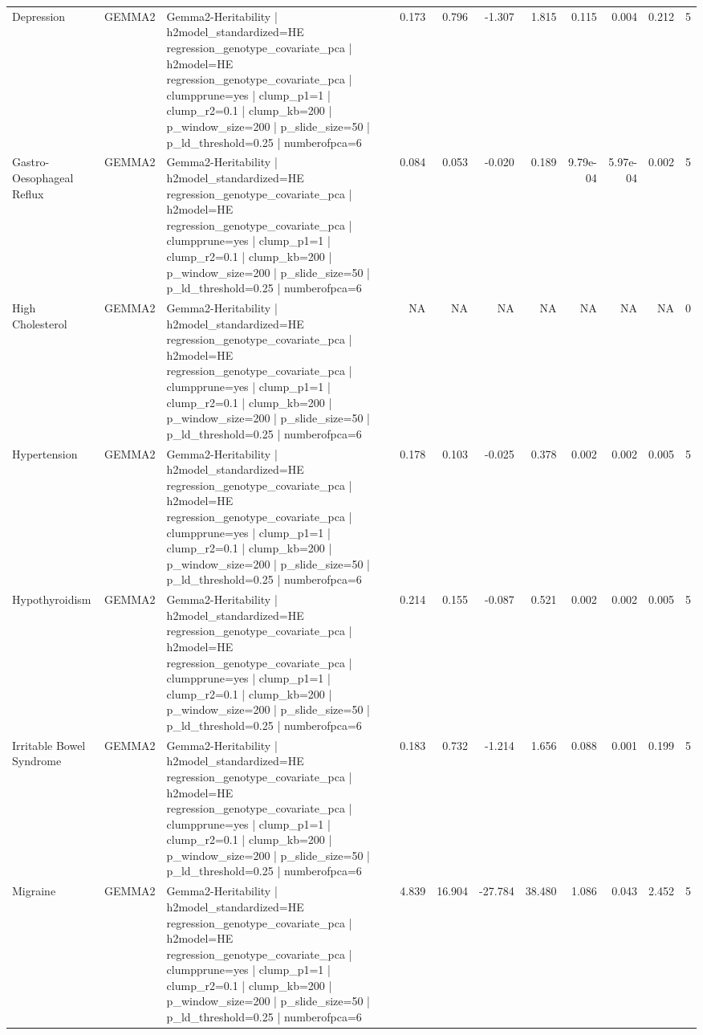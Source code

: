 \begin{landscape}
\begin{longtable}{p{2.4cm}p{1.8cm}p{6.0cm}rrrrrrrr}
Depression & GEMMA2 & Gemma2-Heritability | h2model\_standardized=HE regression\_genotype\_covariate\_pca | h2model=HE regression\_genotype\_covariate\_pca | clumpprune=yes | clump\_p1=1 | clump\_r2=0.1 | clump\_kb=200 | p\_window\_size=200 | p\_slide\_size=50 | p\_ld\_threshold=0.25 | numberofpca=6 & 0.173 & 0.796 & -1.307 & 1.815 & 0.115 & 0.004 & 0.212 & 5 \\
Gastro-Oesophageal Reflux & GEMMA2 & Gemma2-Heritability | h2model\_standardized=HE regression\_genotype\_covariate\_pca | h2model=HE regression\_genotype\_covariate\_pca | clumpprune=yes | clump\_p1=1 | clump\_r2=0.1 | clump\_kb=200 | p\_window\_size=200 | p\_slide\_size=50 | p\_ld\_threshold=0.25 | numberofpca=6 & 0.084 & 0.053 & -0.020 & 0.189 & 9.79e-04 & 5.97e-04 & 0.002 & 5 \\
High Cholesterol & GEMMA2 & Gemma2-Heritability | h2model\_standardized=HE regression\_genotype\_covariate\_pca | h2model=HE regression\_genotype\_covariate\_pca | clumpprune=yes | clump\_p1=1 | clump\_r2=0.1 | clump\_kb=200 | p\_window\_size=200 | p\_slide\_size=50 | p\_ld\_threshold=0.25 | numberofpca=6 & NA & NA & NA & NA & NA & NA & NA & 0 \\
Hypertension & GEMMA2 & Gemma2-Heritability | h2model\_standardized=HE regression\_genotype\_covariate\_pca | h2model=HE regression\_genotype\_covariate\_pca | clumpprune=yes | clump\_p1=1 | clump\_r2=0.1 | clump\_kb=200 | p\_window\_size=200 | p\_slide\_size=50 | p\_ld\_threshold=0.25 | numberofpca=6 & 0.178 & 0.103 & -0.025 & 0.378 & 0.002 & 0.002 & 0.005 & 5 \\
Hypothyroidism & GEMMA2 & Gemma2-Heritability | h2model\_standardized=HE regression\_genotype\_covariate\_pca | h2model=HE regression\_genotype\_covariate\_pca | clumpprune=yes | clump\_p1=1 | clump\_r2=0.1 | clump\_kb=200 | p\_window\_size=200 | p\_slide\_size=50 | p\_ld\_threshold=0.25 | numberofpca=6 & 0.214 & 0.155 & -0.087 & 0.521 & 0.002 & 0.002 & 0.005 & 5 \\
Irritable Bowel Syndrome & GEMMA2 & Gemma2-Heritability | h2model\_standardized=HE regression\_genotype\_covariate\_pca | h2model=HE regression\_genotype\_covariate\_pca | clumpprune=yes | clump\_p1=1 | clump\_r2=0.1 | clump\_kb=200 | p\_window\_size=200 | p\_slide\_size=50 | p\_ld\_threshold=0.25 | numberofpca=6 & 0.183 & 0.732 & -1.214 & 1.656 & 0.088 & 0.001 & 0.199 & 5 \\
Migraine & GEMMA2 & Gemma2-Heritability | h2model\_standardized=HE regression\_genotype\_covariate\_pca | h2model=HE regression\_genotype\_covariate\_pca | clumpprune=yes | clump\_p1=1 | clump\_r2=0.1 | clump\_kb=200 | p\_window\_size=200 | p\_slide\_size=50 | p\_ld\_threshold=0.25 | numberofpca=6 & 4.839 & 16.904 & -27.784 & 38.480 & 1.086 & 0.043 & 2.452 & 5 \\

\end{longtable}
\end{landscape}
